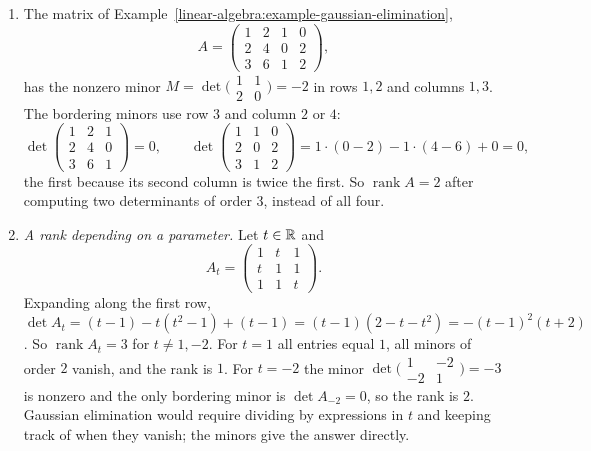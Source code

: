 \begin{example}\label{linear-algebra:example-bordered-minors}
\begin{enumerate}
\item The matrix of Example~\ref{linear-algebra:example-gaussian-elimination},
\[
A = \begin{pmatrix}1 & 2 & 1 & 0\\ 2 & 4 & 0 & 2\\ 3 & 6 & 1 & 2\end{pmatrix},
\]
has the nonzero minor $M = \det\bigl(\begin{smallmatrix}1 & 1\\ 2 & 0\end{smallmatrix}\bigr) = -2$ in rows $1, 2$ and columns $1, 3$. The bordering minors use row $3$ and column $2$ or $4$:
\[
\det\begin{pmatrix}1 & 2 & 1\\ 2 & 4 & 0\\ 3 & 6 & 1\end{pmatrix} = 0, \qquad \det\begin{pmatrix}1 & 1 & 0\\ 2 & 0 & 2\\ 3 & 1 & 2\end{pmatrix} = 1 \cdot (0 - 2) - 1 \cdot (4 - 6) + 0 = 0,
\]
the first because its second column is twice the first. So $\operatorname{rank}A = 2$ after computing two determinants of order $3$, instead of all four.
\item \emph{A rank depending on a parameter.} Let $t \in \mathbb{R}$ and
\[
A_t = \begin{pmatrix}1 & t & 1\\ t & 1 & 1\\ 1 & 1 & t\end{pmatrix}.
\]
Expanding along the first row, $\det A_t = (t - 1) - t(t^2 - 1) + (t - 1) = (t - 1)(2 - t - t^2) = -(t - 1)^2(t + 2)$. So $\operatorname{rank}A_t = 3$ for $t \neq 1, -2$. For $t = 1$ all
entries equal $1$, all minors of order $2$ vanish, and the rank is $1$. For $t = -2$ the minor $\det\bigl(\begin{smallmatrix}1 & -2\\ -2 & 1\end{smallmatrix}\bigr) = -3$ is nonzero and the only bordering
minor is $\det A_{-2} = 0$, so the rank is $2$. Gaussian elimination would require dividing by expressions in $t$ and keeping track of when they vanish; the minors give the answer directly.
\end{enumerate}
\end{example}

